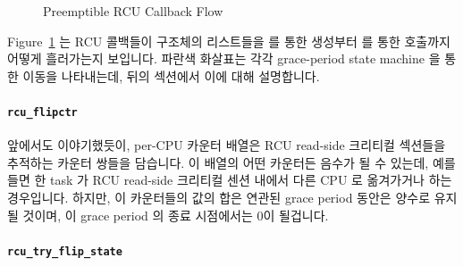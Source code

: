 \begin{figure}[htb]
\centering
{}
\caption{Preemptible RCU Callback Flow}
\label{app:rcuimpl:Preemptible RCU Callback Flow}
\end{figure}

Figure~\ref{app:rcuimpl:Preemptible RCU Callback Flow}
는 RCU 콜백들이  구조체의 리스트들을  를 통한
생성부터  를 통한 호출까지 어떻게 흘러가는지
보입니다.
파란색 화살표는 각각 grace-period state machine 을 통한 이동을 나타내는데, 뒤의
섹션에서 이에 대해 설명합니다.

\paragraph{{\tt rcu\_flipctr}}
\label{app:rcuimpl:rcu_flipctr}

앞에서도 이야기했듯이,  per-CPU 카운터 배열은 RCU read-side
크리티컬 섹션들을 추적하는 카운터 쌍들을 담습니다.
이 배열의 어떤 카운터든 음수가 될 수 있는데, 예를 들면 한 task 가 RCU read-side
크리티컬 센션 내에서 다른 CPU 로 옮겨가거나 하는 경우입니다.
하지만, 이 카운터들의 값의 합은 연관된 grace period 동안은 양수로 유지될
것이며, 이 grace period 의 종료 시점에서는 0이 될겁니다.

\paragraph{{\tt rcu\_try\_flip\_state}}
\label{app:rcuimpl:rcu_try_flip_state}

